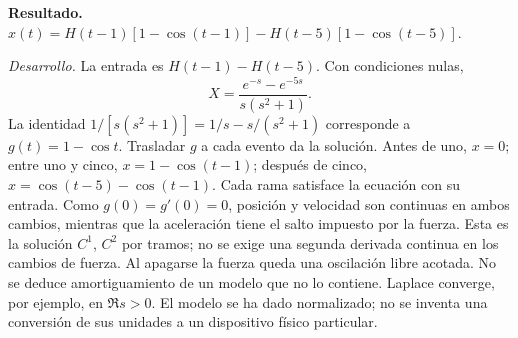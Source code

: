\noindent\textbf{Resultado.} \(x(t)=H(t-1)[1-\cos(t-1)]-H(t-5)[1-\cos(t-5)]\).

\noindent\textit{Desarrollo.} La entrada es \(H(t-1)-H(t-5)\). Con condiciones nulas,
\[X=\frac{e^{-s}-e^{-5s}}{s(s^2+1)}.\]
La identidad \(1/[s(s^2+1)]=1/s-s/(s^2+1)\) corresponde a \(g(t)=1-\cos t\). Trasladar \(g\) a cada evento da la solución.
Antes de uno, \(x=0\); entre uno y cinco, \(x=1-\cos(t-1)\); después de cinco, \(x=\cos(t-5)-\cos(t-1)\). Cada rama satisface la ecuación con su entrada. Como \(g(0)=g'(0)=0\), posición y velocidad son continuas en ambos cambios, mientras que la aceleración tiene el salto impuesto por la fuerza. Esta es la solución \(C^1\), \(C^2\) por tramos; no se exige una segunda derivada continua en los cambios de fuerza.
Al apagarse la fuerza queda una oscilación libre acotada. No se deduce amortiguamiento de un modelo que no lo contiene. Laplace converge, por ejemplo, en \(\Re s>0\). El modelo se ha dado normalizado; no se inventa una conversión de sus unidades a un dispositivo físico particular.
